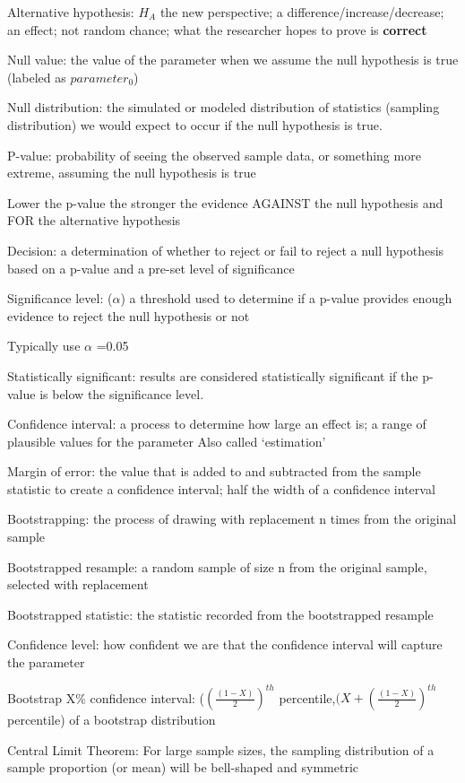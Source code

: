 \documentclass[
]{report}
\newcommand{\rgi}{\hspace{24pt}}  %
\begin{document}
Alternative hypothesis: \(H_A\) the new perspective; a difference/increase/decrease; an effect; not random chance; what the researcher hopes to prove is \textbf{correct}

Null value: the value of the parameter when we assume the null hypothesis is true (labeled as \(parameter_0\))

Null distribution: the simulated or modeled distribution of statistics (sampling distribution) we would expect to occur if the null hypothesis is true.

P-value: probability of seeing the observed sample data, or something more extreme, assuming the null hypothesis is true

\rgi Lower the p-value the stronger the evidence AGAINST the null hypothesis and FOR the alternative hypothesis

Decision: a determination of whether to reject or fail to reject a null hypothesis based on a p-value and a pre-set level of significance

Significance level: (\(\alpha\)) a threshold used to determine if a p-value provides enough evidence to reject the null hypothesis or not

\rgi Typically use \(\alpha\) =0.05

Statistically significant: results are considered statistically significant if the p-value is below the significance level.

Confidence interval: a process to determine how large an effect is; a range of plausible values for the parameter
\rgi Also called `estimation'

Margin of error: the value that is added to and subtracted from the sample statistic to create a confidence interval; half the width of a confidence interval

Bootstrapping: the process of drawing with replacement n times from the original sample

Bootstrapped resample: a random sample of size n from the original sample, selected with replacement

Bootstrapped statistic: the statistic recorded from the bootstrapped resample

Confidence level: how confident we are that the confidence interval will capture the parameter

Bootstrap X\% confidence interval: (\((\frac{(1-X)}{2})^{th}\) percentile,\((X+(\frac{(1-X)}{2})^{th}\) percentile) of a bootstrap distribution

Central Limit Theorem: For large sample sizes, the sampling distribution of a sample proportion (or mean) will be bell-shaped and symmetric
\end{document}
